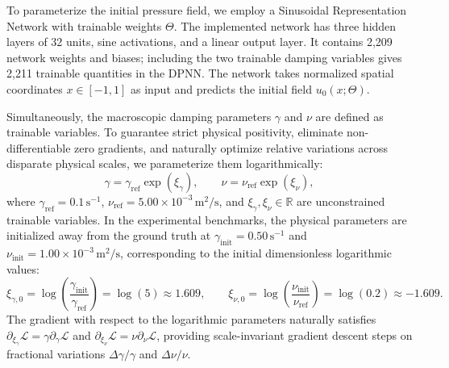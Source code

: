 \documentclass{Configuration_Files/PoliMi3i_thesis}
\newif\ifshowthesischanges
\DeclareRobustCommand{\thesischange}[2]{%
    \ifshowthesischanges
        \textcolor{#1}{#2}%
    \else
        #2%
    \fi
}
\def\thesischange#1#2{#2}%
\begin{document}
\thesischange{red}{To parameterize the initial pressure field, we employ a Sinusoidal Representation Network \citep[SIREN,][]{sitzmann_implicit_2020} with trainable weights $\Theta$. The implemented network has three hidden layers of 32 units, sine activations, and a linear output layer. It contains 2,209 network weights and biases; including the two trainable damping variables gives 2,211 trainable quantities in the DPNN. The network takes normalized spatial coordinates $x \in [-1, 1]$ as input and predicts the initial field $u_0(x; \Theta)$.}

\thesischange{red}{Simultaneously, the macroscopic damping parameters $\gamma$ and $\nu$ are defined as trainable variables. To guarantee strict physical positivity, eliminate non-differentiable zero gradients, and naturally optimize relative variations across disparate physical scales, we parameterize them logarithmically:
\begin{equation}
\label{eq:dpnn_log_param_intro}
\gamma = \gamma_{\mathrm{ref}} \exp(\xi_\gamma), \qquad \nu = \nu_{\mathrm{ref}} \exp(\xi_\nu),
\end{equation}
where $\gamma_{\mathrm{ref}} = 0.1\,\mathrm{s}^{-1}$, $\nu_{\mathrm{ref}} = 5.00 \times 10^{-3}\,\mathrm{m}^2/\mathrm{s}$, and $\xi_\gamma, \xi_\nu \in \mathbb{R}$ are unconstrained trainable variables. In the experimental benchmarks, the physical parameters are initialized away from the ground truth at $\gamma_{\mathrm{init}} = 0.50\,\mathrm{s}^{-1}$ and $\nu_{\mathrm{init}} = 1.00 \times 10^{-3}\,\mathrm{m}^2/\mathrm{s}$, corresponding to the initial dimensionless logarithmic values:
\begin{equation}
\xi_{\gamma,0} = \log\left(\frac{\gamma_{\mathrm{init}}}{\gamma_{\mathrm{ref}}}\right) = \log(5) \approx 1.609, \qquad \xi_{\nu,0} = \log\left(\frac{\nu_{\mathrm{init}}}{\nu_{\mathrm{ref}}}\right) = \log(0.2) \approx -1.609.
\end{equation}
The gradient with respect to the logarithmic parameters naturally satisfies $\partial_{\xi_\gamma} \mathcal{L} = \gamma \partial_\gamma \mathcal{L}$ and $\partial_{\xi_\nu} \mathcal{L} = \nu \partial_\nu \mathcal{L}$, providing scale-invariant gradient descent steps on fractional variations $\Delta \gamma / \gamma$ and $\Delta \nu / \nu$.}
\end{document}
